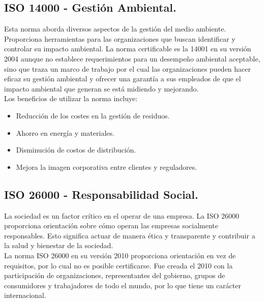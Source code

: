 \documentclass[spanish, fleqn]{article}
\begin{document}
	\subsection{ISO 14000 - Gestión Ambiental.}
	Esta norma aborda diversos aspectos de la gestión del medio ambiente.
	Proporciona herramientas para las organizaciones que buscan identificar y 
	controlar su impacto ambiental. La norma certificable es la 14001 en su
	versión 2004\cite{iso14} aunque no establece requerimientos para un 
	desempeño ambiental aceptable, sino que traza un marco de trabajo por el
	cual las organizaciones pueden hacer eficaz su gestión ambiental y ofrecer
	una garantía a sus empleados de que el impacto ambiental que generan se está
	midiendo y mejorando.\\
	Los beneficios de utilizar la norma incluye:
	\begin{itemize}
		\item Reducción de los costes en la gestión de residuos.
		\item Ahorro en energía y materiales.
		\item Disminución de costos de distribución.
		\item Mejora la imagen corporativa entre clientes y reguladores.
	\end{itemize}
	\subsection{ISO 26000 - Responsabilidad Social.}
	La sociedad es un factor crítico en el operar de una empresa. La ISO 26000
	proporciona orientación sobre cómo operan las empresas socialmente 
	responsables. Esto significa actuar de manera ética y transparente y 
	contribuir a la salud y bienestar de la sociedad.\\
	La norma ISO 26000 en su versión 2010\cite{iso26} proporciona orientación en
	vez de requisitos, por lo cual no es posible certificarse. Fue creada el
	2010 con la participación de organizaciones, representantes del gobierno,
	grupos de consumidores y trabajadores de todo el mundo, por lo que tiene un
	carácter internacional.
\end{document}
